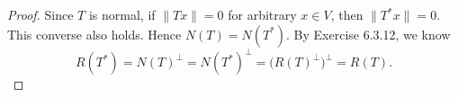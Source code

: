 \begin{Exercise}
\begin{proof}
Since $T$ is normal, if $\|T x\| = 0$ for arbitrary $x\in V$, then $\|T^* x \| = 0$. This converse also holds. Hence $N(T) = N(T^*)$. By Exercise 6.3.12, we know 
$$
R(T^*) = N(T)^{\perp} = N(T^*)^{\perp} = \big(R(T)^{\perp}\big)^{\perp} = R(T).
$$
\end{proof}
\end{Exercise}